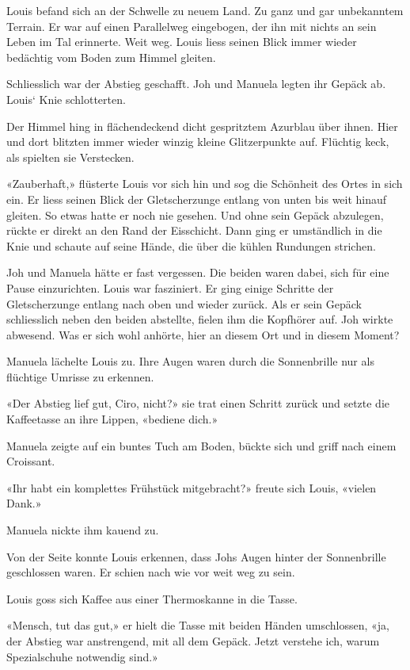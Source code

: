 Louis befand sich an der Schwelle zu neuem Land. Zu ganz und gar
unbekanntem Terrain. Er war auf einen Parallelweg eingebogen, der ihn
mit nichts an sein Leben im Tal erinnerte. Weit weg. Louis liess seinen
Blick immer wieder bedächtig vom Boden zum Himmel gleiten.

Schliesslich war der Abstieg geschafft. Joh und Manuela legten ihr
Gepäck ab. Louis` Knie schlotterten.

Der Himmel hing in flächendeckend dicht gespritztem Azurblau über ihnen.
Hier und dort blitzten immer wieder winzig kleine Glitzerpunkte auf.
Flüchtig keck, als spielten sie Verstecken.

«Zauberhaft,» flüsterte Louis vor sich hin und sog die Schönheit des
Ortes in sich ein. Er liess seinen Blick der Gletscherzunge entlang von
unten bis weit hinauf gleiten. So etwas hatte er noch nie gesehen. Und
ohne sein Gepäck abzulegen, rückte er direkt an den Rand der Eisschicht.
Dann ging er umständlich in die Knie und schaute auf seine Hände, die
über die kühlen Rundungen strichen.

Joh und Manuela hätte er fast vergessen. Die beiden waren dabei, sich
für eine Pause einzurichten. Louis war fasziniert. Er ging einige
Schritte der Gletscherzunge entlang nach oben und wieder zurück. Als er
sein Gepäck schliesslich neben den beiden abstellte, fielen ihm die
Kopfhörer auf. Joh wirkte abwesend. Was er sich wohl anhörte, hier an
diesem Ort und in diesem Moment?

Manuela lächelte Louis zu. Ihre Augen waren durch die Sonnenbrille nur
als flüchtige Umrisse zu erkennen.

«Der Abstieg lief gut, Ciro, nicht?» sie trat einen Schritt zurück und
setzte die Kaffeetasse an ihre Lippen, «bediene dich.»

Manuela zeigte auf ein buntes Tuch am Boden, bückte sich und griff nach
einem Croissant.

«Ihr habt ein komplettes Frühstück mitgebracht?» freute sich Louis,
«vielen Dank.»

Manuela nickte ihm kauend zu.

Von der Seite konnte Louis erkennen, dass Johs Augen hinter der
Sonnenbrille geschlossen waren. Er schien nach wie vor weit weg zu sein.

Louis goss sich Kaffee aus einer Thermoskanne in die Tasse.

«Mensch, tut das gut,» er hielt die Tasse mit beiden Händen umschlossen,
«ja, der Abstieg war anstrengend, mit all dem Gepäck. Jetzt verstehe
ich, warum Spezialschuhe notwendig sind.»

